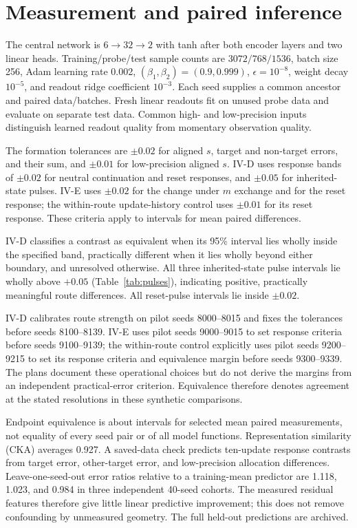 \section{Measurement and paired inference}
\label{app:measurement}
The central network is $6\to32\to2$ with tanh after both encoder layers and two linear heads. Training/probe/test sample counts are $3072/768/1536$, batch size 256, Adam learning rate 0.002, $(\beta_1,\beta_2)=(0.9,0.999)$, $\epsilon=10^{-8}$, weight decay $10^{-5}$, and readout ridge coefficient $10^{-3}$. Each seed supplies a common ancestor and paired data/batches. Fresh linear readouts fit on unused probe data and evaluate on separate test data. Common high- and low-precision inputs distinguish learned readout quality from momentary observation quality.

The formation tolerances are $\pm0.02$ for aligned $s$, target and non-target errors, and their sum, and $\pm0.01$ for low-precision aligned $s$. IV-D uses response bands of $\pm0.02$ for neutral continuation and reset responses, and $\pm0.05$ for inherited-state pulses. IV-E uses $\pm0.02$ for the change under $m$ exchange and for the reset response; the within-route update-history control uses $\pm0.01$ for its reset response. These criteria apply to intervals for mean paired differences.

IV-D classifies a contrast as equivalent when its 95\% interval lies wholly inside the specified band, practically different when it lies wholly beyond either boundary, and unresolved otherwise. All three inherited-state pulse intervals lie wholly above $+0.05$ (Table~\ref{tab:pulses}), indicating positive, practically meaningful route differences. All reset-pulse intervals lie inside $\pm0.02$.

IV-D calibrates route strength on pilot seeds 8000--8015 and fixes the tolerances before seeds 8100--8139. IV-E uses pilot seeds 9000--9015 to set response criteria before seeds 9100--9139; the within-route control explicitly uses pilot seeds 9200--9215 to set its response criteria and equivalence margin before seeds 9300--9339. The plans document these operational choices but do not derive the margins from an independent practical-error criterion. Equivalence therefore denotes agreement at the stated resolutions in these synthetic comparisons.

Endpoint equivalence is about intervals for selected mean paired measurements, not equality of every seed pair or of all model functions. Representation similarity (CKA) averages 0.927. A saved-data check predicts ten-update response contrasts from target error, other-target error, and low-precision allocation differences. Leave-one-seed-out error ratios relative to a training-mean predictor are 1.118, 1.023, and 0.984 in three independent 40-seed cohorts. The measured residual features therefore give little linear predictive improvement; this does not remove confounding by unmeasured geometry. The full held-out predictions are archived.

